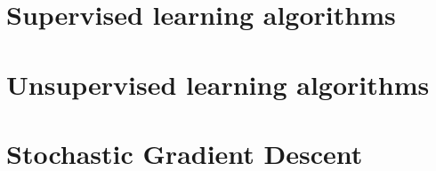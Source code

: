 \section{Supervised learning algorithms}
\section{Unsupervised learning algorithms}
\section{Stochastic Gradient Descent}